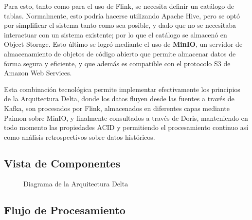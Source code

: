 Para esto, tanto como para el uso de Flink, se necesita definir un catálogo de tablas.
Normalmente, esto podría hacerse utilizando Apache Hive, pero se optó por simplificar el sistema tanto como sea posible, 
y dado que no se necesitaba interactuar con un sistema existente; por lo que el catálogo se almacenó en Object Storage.\newline
\newpage
Esto último se logró mediante el uso de \textbf{MinIO}, un servidor de almacenamiento de objetos de código abierto que
permite almacenar datos de forma segura y eficiente, y que además es compatible con el protocolo S3 de Amazon Web Services.\newline

Esta combinación tecnológica permite implementar efectivamente los principios de la Arquitectura Delta, 
donde los datos fluyen desde las fuentes a través de Kafka, son procesados por Flink, 
almacenados en diferentes capas mediante Paimon sobre MinIO, y finalmente consultados a través de Doris, 
manteniendo en todo momento las propiedades ACID 
y permitiendo el procesamiento continuo así como análisis retrospectivos sobre datos históricos.

\newpage
\subsection{Vista de Componentes}


\begin{figure}[h]
    \caption{Diagrama de la Arquitectura Delta}
    \label{fig:des_arquitectura_delta}
\end{figure}

\clearpage
\newpage

\subsection{Flujo de Procesamiento}

